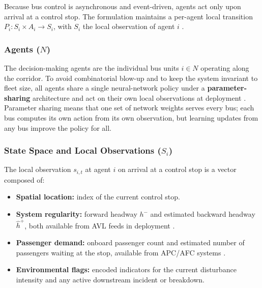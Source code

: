 Because bus control is asynchronous and event-driven, agents act only upon arrival at a control stop. The formulation maintains a per-agent local transition $P_i : S_i \times A_i \rightarrow S_i$, with $S_i$ the local observation of agent $i$ \cite{Wangsun,Rodriguez2023Cooperative}.

\subsubsection{Agents ($N$)}

The decision-making agents are the individual bus units $i \in N$ operating along the corridor. To avoid combinatorial blow-up and to keep the system invariant to fleet size, all agents share a single neural-network policy under a \textbf{parameter-sharing} architecture and act on their own local observations at deployment \cite{Wangsun,Rodriguez2023Cooperative,Christianos2021PS}. Parameter sharing means that one set of network weights serves every bus; each bus computes its own action from its own observation, but learning updates from any bus improve the policy for all.

\subsubsection{State Space and Local Observations ($S_i$)}
\label{subsec:state-space}

The local observation $s_{i,t}$ at agent $i$ on arrival at a control stop is a vector composed of:

\begin{itemize}
\item \textbf{Spatial location:} index of the current control stop.
\item \textbf{System regularity:} forward headway $h^-$ and estimated backward headway $\hat{h}^+$, both available from AVL feeds in deployment \cite{Wangsun}.
\item \textbf{Passenger demand:} onboard passenger count and estimated number of passengers waiting at the stop, available from APC/AFC systems \cite{Wangsun}.
\item \textbf{Environmental flags:} encoded indicators for the current disturbance intensity and any active downstream incident or breakdown.
\end{itemize}

